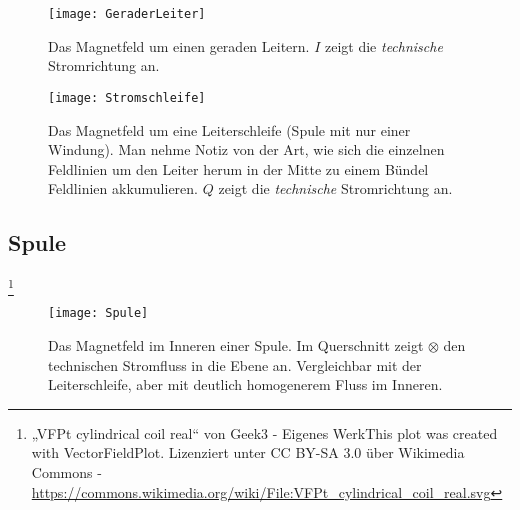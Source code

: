 \begin{figure}[ht!]
	\centering
	\begin{minipage}[b]{0.4\linewidth}
   	\texttt{[image: GeraderLeiter]}
		\caption{Das Magnetfeld um einen geraden Leitern. $I$ zeigt die \emph{technische} Stromrichtung an.}
	\end{minipage}
	\quad
	\begin{minipage}[b]{0.4\linewidth}
    	\texttt{[image: Stromschleife]}
	\caption{Das Magnetfeld um eine Leiterschleife (Spule mit nur einer Windung). Man nehme Notiz von der Art, wie sich die einzelnen Feldlinien um den Leiter herum in der Mitte zu einem Bündel Feldlinien akkumulieren. $Q$ zeigt die \emph{technische} Stromrichtung an.}
	\end{minipage}
\end{figure}

\newpage

\subsection{Spule} \label{subsec:MFeldSpule}
\footnote{„VFPt cylindrical coil real“ von Geek3 - Eigenes WerkThis plot was created with VectorFieldPlot. Lizenziert unter CC BY-SA 3.0 über Wikimedia Commons - \url{https://commons.wikimedia.org/wiki/File:VFPt_cylindrical_coil_real.svg}}
\label{subsec:Spule}

\hfill

\begin{figure}[ht!]
	\centering
   	\texttt{[image: Spule]}
		\caption{Das Magnetfeld im Inneren einer Spule. Im Querschnitt zeigt $\otimes$ den technischen Stromfluss in die Ebene an. Vergleichbar mit der Leiterschleife, aber mit deutlich homogenerem Fluss im Inneren.}
\end{figure}



